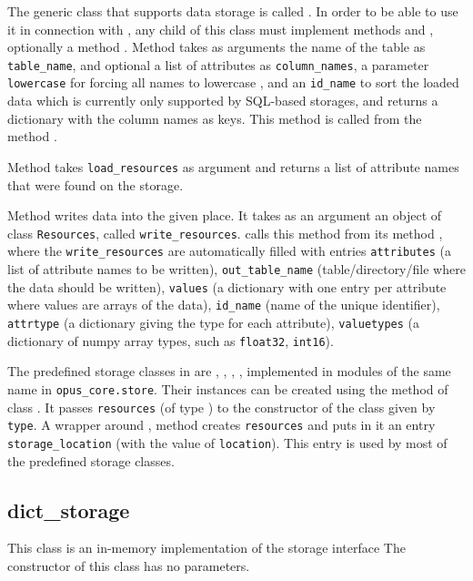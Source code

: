 {The generic class that supports data storage is called . In
order to be able to use it in connection with , any child of
this class must implement methods  and
, optionally a method
. Method  takes as arguments
the name of the table as \verb|table_name|, and optional a list of attributes
 as \verb|column_names|, a parameter \verb|lowercase| for forcing all names to lowercase
, and an \verb|id_name| to sort the loaded data
which is currently only supported by SQL-based storages, and returns
a dictionary with the column names as keys. This method is called from the
 method .

Method  takes \verb|load_resources| as
argument and returns a list of attribute names that were found on the storage.

Method  writes data into the given place. It takes as
an argument an object of class \verb|Resources|, called
\verb|write_resources|.  \datasetindex calls this method from its method
, where the \verb|write_resources| are automatically
filled with entries \verb|attributes| (a list of attribute names to be written),
\verb|out_table_name| (table/directory/file where the data should be written),
\verb|values| (a dictionary with one entry per attribute where values are arrays
of the data), \verb|id_name| (name of the unique identifier), \verb|attrtype| (a
dictionary giving the type for each attribute), \verb|valuetypes| (a dictionary
of numpy array types, such as \verb|float32|, \verb|int16|).


The predefined storage classes in  are ,
, , , implemented
in modules of the same name in \verb|opus_core.store|. Their instances can be
created using the method  of class
. It passes \verb|resources| (of type )
to the constructor of the class given by \verb|type|. A wrapper around
, method  creates \verb|resources| and puts in it an entry
\verb|storage_location| (with the value of \verb|location|). This entry is used
by most of the predefined storage classes.

\subsection{dict_storage}
\label{sec:ram-storage}
%
This class is an in-memory implementation of the storage interface
The constructor of this class has no parameters.

}
